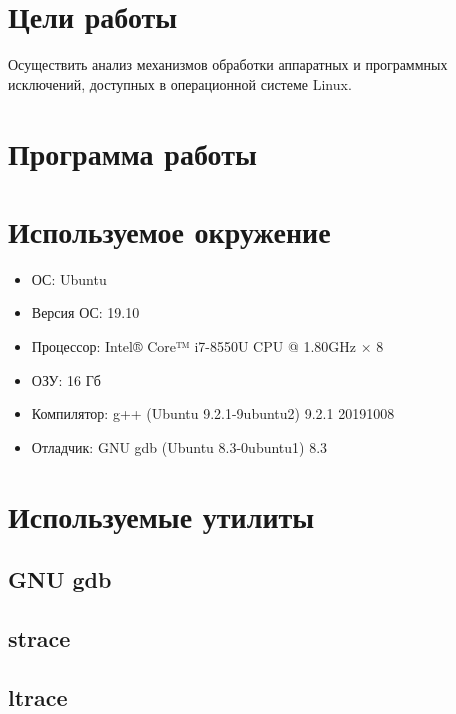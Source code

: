 





\tableofcontents
\newpage

\section{Цели работы}

Осуществить анализ механизмов обработки аппаратных и программных исключений, доступных в операционной системе Linux.

\section{Программа работы}



\section{Используемое окружение}

\begin{itemize}
	\item ОС: Ubuntu
	\item Версия ОС: 19.10
	\item Процессор: Intel® Core™ i7-8550U CPU @ 1.80GHz × 8
	\item ОЗУ: 16 Гб
	\item Компилятор: g++ (Ubuntu 9.2.1-9ubuntu2) 9.2.1 20191008
	\item Отладчик: GNU gdb (Ubuntu 8.3-0ubuntu1) 8.3
\end{itemize}

\section{Используемые утилиты}

\subsection{GNU gdb}


\subsection{strace}


\subsection{ltrace}

